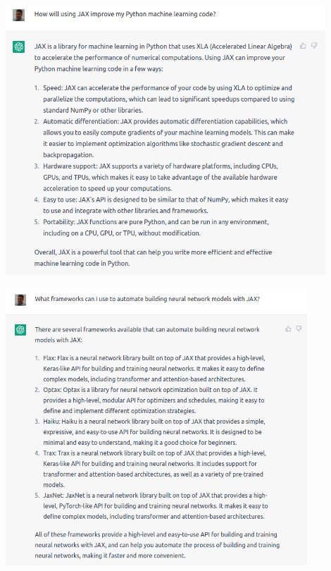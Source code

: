\documentclass[mathserif,handout]{beamer}
\begin{document}
\begin{frame}
\centerline{\includegraphics[width=0.9\textwidth]{cgpt3}}
\end{frame}


\begin{frame}
\centerline{\includegraphics[width=0.85\textwidth]{cgpt4}}
\end{frame}
\end{document}
